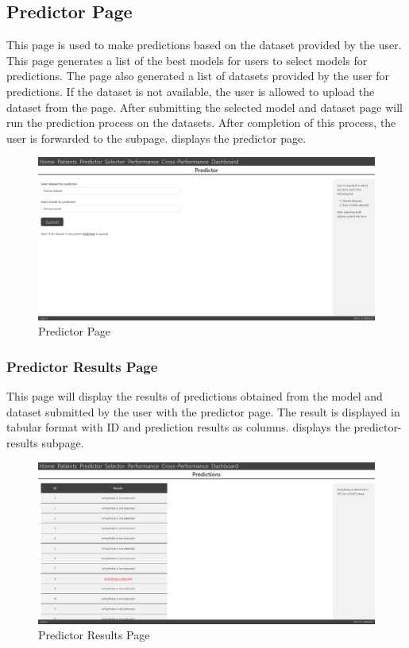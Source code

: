 \FloatBarrier
\subsection{Predictor Page} \label{subsec:predictor_page}
This page is used to make predictions based on the dataset provided by the user. This page generates a list of the best models for users to select models for predictions. The page also generated a list of datasets provided by the user for predictions. If the dataset is not available, the user is allowed to upload the dataset from the page. After submitting the selected model and dataset page will run the prediction process on the datasets. After completion of this process, the user is forwarded to the subpage.  displays the predictor page.

\begin{figure}[H]
  \centering
  \includegraphics[width=0.7\columnwidth]{media/website/pages/predictor.png}
  \caption{Predictor Page}
  \label{fig:web_predictor_page}
\end{figure}

\subsubsection{Predictor Results Page} \label{subsubsec:predictor_result_page}
This page will display the results of predictions obtained from the model and dataset submitted by the user with the predictor page. The result is displayed in tabular format with ID and prediction results as columns.  displays the predictor-results subpage.

\begin{figure}[H]
  \centering
  \includegraphics[width=0.7\columnwidth]{media/website/pages/predictor_display.png}
  \caption{Predictor Results Page}
  \label{fig:web_predictor_results_page}
\end{figure}

